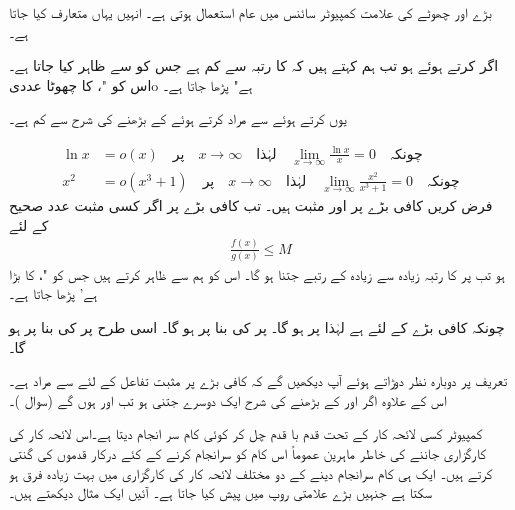 بڑے  اور چھوٹے  کی علامت کمپیوٹر سائنس میں عام استعمال ہوتی ہے۔ انہیں یہاں متعارف کیا جاتا ہے۔

اگر  کرتے ہوئے  ہو تب  ہم کہتے ہیں کہ  کا رتبہ  سے کم ہے جس کو   سے ظاہر کیا جاتا ہے۔ اس کو "،  کا چھوٹا عددی{o} ہے" پڑھا جاتا ہے۔ 

یوں  کرتے ہوئے   سے مراد  کرتے ہوئے  کے بڑھنے کی شرح  سے کم ہے۔

\begin{align*}
\ln x&=o(x) \quad \text{پر}\quad x\to\infty\quad \text{لہٰذا}\quad \lim_{x\to\infty}\frac{\ln x}{x}=0\quad \text{چونکہ}\\
x^2&=o(x^3+1) \quad \text{پر}\quad x\to\infty\quad \text{لہٰذا}\quad \lim_{x\to\infty}\frac{x^2}{x^3+1}=0\quad \text{چونکہ}
\end{align*}
فرض کریں کافی بڑے  پر  اور  مثبت ہیں۔ تب کافی بڑے   پر اگر کسی مثبت عدد صحیح  کے لئے
\begin{align*}
\frac{f(x)}{g(x)}\le M
\end{align*}
ہو تب  پر  کا رتبہ زیادہ سے زیادہ  کے رتبے جتنا ہو گا۔ اس کو ہم  سے ظاہر کرتے ہیں جس
 کو "،  کا بڑا  ہے' پڑھا جاتا ہے۔

چونکہ کافی بڑے  کے لئے  ہے لہٰذا  پر  ہو گا۔
 پر   کی بنا  پر  ہو گا۔ اسی طرح 
 پر   کی بنا  پر  ہو گا۔

تعریف پر دوبارہ نظر دوڑاتے ہوئے  آپ دیکھیں گے کہ کافی بڑے  پر مثبت تفاعل کے لئے  سے مراد  ہے۔ اس کے علاوہ اگر  اور   کے بڑھنے کی شرح ایک دوسرے جتنی ہو تب  اور  ہوں گے (سوال )۔ 

کمپیوٹر کسی لائحہ کار کے تحت قدم با قدم چل کر کوئی کام سر انجام دیتا ہے۔اس لائحہ کار کی کارگزاری جاننے کی خاطر ماہرین عموماً اس کام کو سرانجام کرنے کے کئے درکار قدموں کی گنتی کرتے ہیں۔ ایک ہی کام سرانجام دینے کے دو مختلف لائحہ کار کی کارگزاری میں بہت زیادہ فرق ہو سکتا ہے جنہیں بڑے  علامتی روپ میں پیش کیا جاتا ہے۔ آئیں ایک مثال دیکھتے ہیں۔

